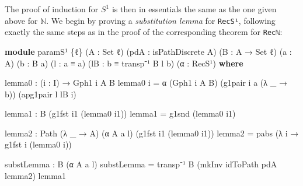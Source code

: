\documentclass[
  12pt]{article}
\newenvironment{Shaded}{\begin{snugshade}}{\end{snugshade}}
\newcommand{\DataTypeTok}[1]{\textcolor[rgb]{0.00,0.34,0.68}{#1}}
\newcommand{\KeywordTok}[1]{\textcolor[rgb]{0.12,0.11,0.11}{\textbf{#1}}}
\newcommand{\NormalTok}[1]{\textcolor[rgb]{0.12,0.11,0.11}{#1}}
\newcommand{\OtherTok}[1]{\textcolor[rgb]{0.00,0.43,0.16}{#1}}
\begin{document}
The proof of induction for \(S^1\) is then in essentials the same as the
one given above for \(\mathbb{N}\). We begin by proving a
\emph{substitution lemma} for \texttt{RecS¹}, following exactly the same
steps as in the proof of the corresponding theorem for \texttt{Recℕ}:

\begin{Shaded}
\begin{Highlighting}[]
\KeywordTok{module}\NormalTok{ paramS¹ }\OtherTok{\{}\NormalTok{ℓ}\OtherTok{\}} \OtherTok{(}\NormalTok{A }\OtherTok{:} \DataTypeTok{Set}\NormalTok{ ℓ}\OtherTok{)} \OtherTok{(}\NormalTok{pdA }\OtherTok{:}\NormalTok{ isPathDiscrete A}\OtherTok{)} \OtherTok{(}\NormalTok{B }\OtherTok{:}\NormalTok{ A }\OtherTok{→} \DataTypeTok{Set}\NormalTok{ ℓ}\OtherTok{)} 
                   \OtherTok{(}\NormalTok{a }\OtherTok{:}\NormalTok{ A}\OtherTok{)} \OtherTok{(}\NormalTok{b }\OtherTok{:}\NormalTok{ B a}\OtherTok{)} \OtherTok{(}\NormalTok{l }\OtherTok{:}\NormalTok{ a ≡ a}\OtherTok{)}
                   \OtherTok{(}\NormalTok{lB }\OtherTok{:}\NormalTok{ b ≡ transp⁻¹ B l b}\OtherTok{)} \OtherTok{(}\NormalTok{α }\OtherTok{:}\NormalTok{ RecS¹}\OtherTok{)} \KeywordTok{where}

\NormalTok{    lemma0 }\OtherTok{:} \OtherTok{(}\NormalTok{i }\OtherTok{:}\NormalTok{ I}\OtherTok{)} \OtherTok{→}\NormalTok{ Gph1 i A B}
\NormalTok{    lemma0 i }\OtherTok{=}\NormalTok{ α }\OtherTok{(}\NormalTok{Gph1 i A B}\OtherTok{)} \OtherTok{(}\NormalTok{g1pair i a }\OtherTok{(λ} \OtherTok{\_} \OtherTok{→}\NormalTok{ b}\OtherTok{))} \OtherTok{(}\NormalTok{apg1pair l lB i}\OtherTok{)}

\NormalTok{    lemma1 }\OtherTok{:}\NormalTok{ B }\OtherTok{(}\NormalTok{g1fst i1 }\OtherTok{(}\NormalTok{lemma0 i1}\OtherTok{))}
\NormalTok{    lemma1 }\OtherTok{=}\NormalTok{ g1snd }\OtherTok{(}\NormalTok{lemma0 i1}\OtherTok{)}

\NormalTok{    lemma2 }\OtherTok{:}\NormalTok{ Path }\OtherTok{(λ} \OtherTok{\_} \OtherTok{→}\NormalTok{ A}\OtherTok{)} \OtherTok{(}\NormalTok{α A a l}\OtherTok{)} \OtherTok{(}\NormalTok{g1fst i1 }\OtherTok{(}\NormalTok{lemma0 i1}\OtherTok{))}
\NormalTok{    lemma2 }\OtherTok{=}\NormalTok{ pabs }\OtherTok{(λ}\NormalTok{ i }\OtherTok{→}\NormalTok{ g1fst i }\OtherTok{(}\NormalTok{lemma0 i}\OtherTok{))}

\NormalTok{    substLemma }\OtherTok{:}\NormalTok{ B }\OtherTok{(}\NormalTok{α A a l}\OtherTok{)}
\NormalTok{    substLemma }\OtherTok{=}\NormalTok{ transp⁻¹ B }\OtherTok{(}\NormalTok{mkInv idToPath pdA lemma2}\OtherTok{)}\NormalTok{ lemma1}
\end{Highlighting}
\end{Shaded}
\end{document}
